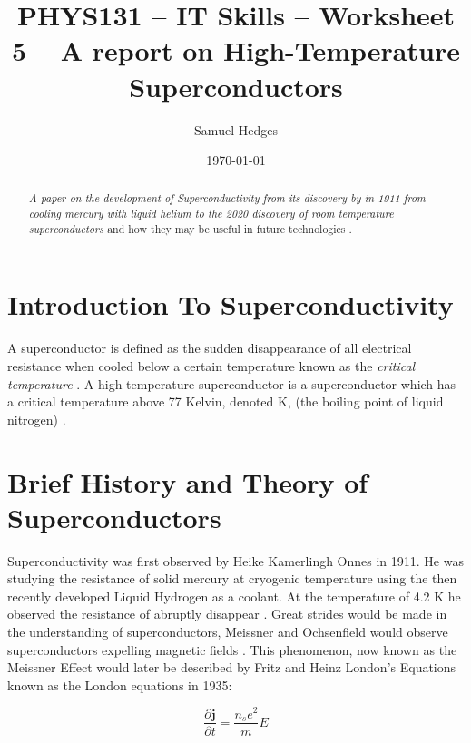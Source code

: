 \documentclass[12pt]{article}
\begin{document}
    \title{PHYS131 -- IT Skills -- Worksheet 5 -- A report on High-Temperature Superconductors }
    \author{Samuel Hedges}
    \date{\today}
    \maketitle

    \begin{abstract}
     \textit{A paper on the development of Superconductivity from its discovery by \cite{Onnes} in 1911 from cooling mercury with liquid helium to the 2020 discovery of room temperature superconductors \cite{Room-Temperature Superconductivity}} and how they may be useful in future technologies \cite{Lancaster}.
    \end{abstract}

    \tableofcontents
\section{Introduction To Superconductivity}


A superconductor is defined as the sudden disappearance of all electrical resistance when cooled below a certain temperature known as the \textit{critical temperature} \cite{Y&F}. A high-temperature superconductor is a superconductor which has a critical temperature above 77 Kelvin, denoted K, (the boiling point of liquid nitrogen) \cite{2}.\\

\section{Brief History and Theory of Superconductors}

Superconductivity was first observed by Heike Kamerlingh Onnes in 1911. He was studying the resistance of solid mercury at cryogenic temperature using the then recently developed Liquid Hydrogen as a coolant. At the temperature of 4.2 K he observed the resistance of abruptly disappear \cite{Onnes}. Great strides would be made in the understanding of superconductors, Meissner and Ochsenfield would observe superconductors expelling magnetic fields \cite{Meissner Effect}. This phenomenon, now known as the Meissner Effect would later be described by Fritz and Heinz London's Equations known as the London equations in 1935:

\begin{equation}
\frac{\partial\mathbf{j}}{\partial t} = \frac{n_{s}e^2}{m}E   
\end{equation}
\end{document}
